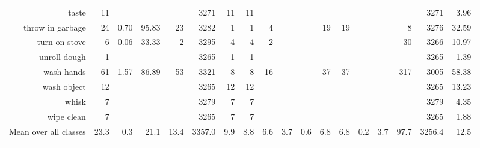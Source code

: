 \begin{tabular}{r r r@{\ \ }r@{\ \ }r@{\ \ }r@{\ \ }r r@{\ \ }r@{\ \ }r@{\ \ }r@{\ \ }r@{\ \ }r@{\ \ }r@{\ \ }r@{\ \ }r@{\ \ }r r}
taste & 11 &  &  &  & 3271 & 11 & 11 &  &  &  &  &  &  &  &  & 3271 & 3.96 \\
throw in garbage & 24 & 0.70 & 95.83 & 23 & 3282 & 1 & 1 & 4 &  &  & 19 & 19 &  &  & 8 & 3276 & 32.59 \\
turn on stove & 6 & 0.06 & 33.33 & 2 & 3295 & 4 & 4 & 2 &  &  &  &  &  &  & 30 & 3266 & 10.97 \\
unroll dough & 1 &  &  &  & 3265 & 1 & 1 &  &  &  &  &  &  &  &  & 3265 & 1.39 \\
wash hands & 61 & 1.57 & 86.89 & 53 & 3321 & 8 & 8 & 16 &  &  & 37 & 37 &  &  & 317 & 3005 & 58.38 \\
wash object & 12 &  &  &  & 3265 & 12 & 12 &  &  &  &  &  &  &  &  & 3265 & 13.23 \\
whisk & 7 &  &  &  & 3279 & 7 & 7 &  &  &  &  &  &  &  &  & 3279 & 4.35 \\
wipe clean & 7 &  &  &  & 3265 & 7 & 7 &  &  &  &  &  &  &  &  & 3265 & 1.88 \\
\cmidrule(lr){1-1} \cmidrule(lr){2-2} \cmidrule(lr){3-7} \cmidrule(lr){8-17} \cmidrule(lr){18-18}
Mean over all classes&23.3&0.3&21.1&13.4&3357.0&9.9&8.8&6.6&3.7&0.6&6.8&6.8&0.2&3.7&97.7&3256.4&12.5
\\ \bottomrule \\ \end{tabular}
